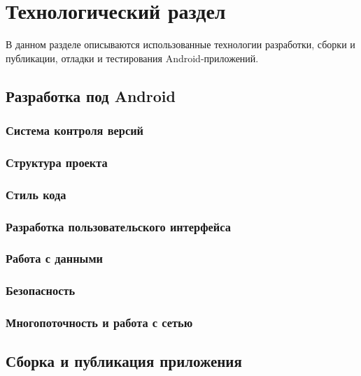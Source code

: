 \chapter{Технологический раздел}
\label{ch:tech}
В данном разделе описываются использованные технологии разработки, сборки и публикации, отладки и тестирования Android-приложений.

\section{Разработка под Android}
\label{sec:dev}

\subsection{Система контроля версий}
\label{subsec:vcs}

\subsection{Структура проекта}
\label{subsec:arch}

\subsection{Стиль кода}
\label{subsec:codestyle}

\subsection{Разработка пользовательского интерфейса}
\label{subsec:ui}

\subsection{Работа с данными}
\label{subsec:data}

\subsection{Безопасность}
\label{subsec:security}

\subsection{Многопоточность и работа с сетью}
\label{subsec:async}


\section{Сборка и публикация приложения}
\label{sec:build}

